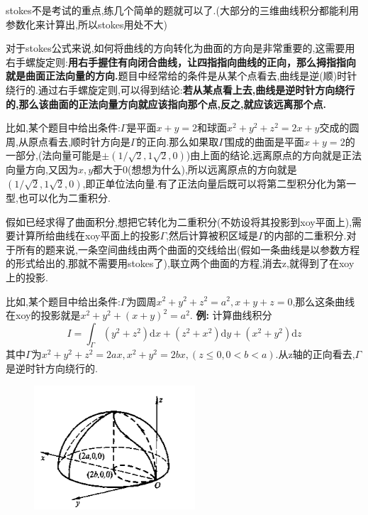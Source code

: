 \documentclass{ctexart}
\begin{document}
stokes不是考试的重点,练几个简单的题就可以了.(大部分的三维曲线积分都能利用参数化来计算出,所以stokes用处不大)

对于stokes公式来说,如何将曲线的方向转化为曲面的方向是非常重要的,这需要用右手螺旋定则:\textbf{用右手握住有向闭合曲线，让四指指向曲线的正向，那么拇指指向就是曲面正法向量的方向.}题目中经常给的条件是从某个点看去,曲线是逆(顺)时针绕行的.通过右手螺旋定则,可以得到结论:\textbf{若从某点看上去,曲线是逆时针方向绕行的,那么该曲面的正法向量方向就应该指向那个点,反之,就应该远离那个点.}

比如,某个题目中给出条件:$\Gamma$是平面$x+y=2$和球面$x^{2}+y^{2}+z^{2}=2{x+y}$交成的圆周,从原点看去,顺时针方向是$\Gamma$的正向.那么如果取$\Gamma$围成的曲面是平面$x+y=2$的一部分,(法向量可能是$\pm(1/\sqrt{2},1\sqrt{2},0)$)由上面的结论,远离原点的方向就是正法向量方向,又因为$x,y$都大于0(想想为什么),所以远离原点的方向就是$(1/\sqrt{2},1\sqrt{2},0)$,即正单位法向量.有了正法向量后既可以将第二型积分化为第一型,也可以化为二重积分.

假如已经求得了曲面积分,想把它转化为二重积分(不妨设将其投影到xoy平面上),需要计算所给曲线在xoy平面上的投影$\Gamma$,然后计算被积区域是$\Gamma$的内部的二重积分.对于所有的题来说,一条空间曲线由两个曲面的交线给出(假如一条曲线是以参数方程的形式给出的,那就不需要用stokes了),联立两个曲面的方程,消去z,就得到了在xoy上的投影.

比如,某个题目中给出条件:$\Gamma$为圆周$x^{2}+y^{2}+z^{2}=a^{2},x+y+z=0$,那么这条曲线在xoy的投影就是$x^{2}+y^{2}+(x+y)^{2}=a^{2}$.
\newline
\newline
\textbf{例:}
计算曲线积分$$I=\int_{\Gamma}(y^{2}+z^{2})\mathrm{d}x+(z^{2}+x^{2})\mathrm{d}y+(x^{2}+y^{2})\mathrm{d}z$$
其中$\Gamma$为$x^{2}+y^{2}+z^{2}=2ax,x^{2}+y^{2}=2bx,(z\leq 0,0<b<a)$.从z轴的正向看去,$\Gamma$是逆时针方向绕行的.
\begin{figure}[h!]
  \centering

  \includegraphics[width=6cm]{3.png}\\

\end{figure}
\end{document}
